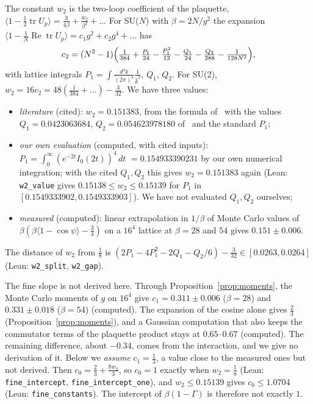 \documentclass[11pt,a4paper]{article}
\theoremstyle{definition}
\theoremstyle{remark}
\newcommand{\code}[1]{\texttt{#1}}
\begin{document}
The constant $w_2$ is the two-loop coefficient of the plaquette, $\langle1-\frac12\operatorname{tr}U_p\rangle=\frac3{4\beta}+\frac{w_2}{\beta^2}+\dots$ For SU($N$) with $\beta=2N/g^2$ the expansion $\langle1-\frac1N\operatorname{Re}\operatorname{tr}U_p\rangle=c_1g^2+c_2g^4+\dots$ has~\cite{AFP}
\[
c_2=(N^2-1)\Bigl(\tfrac1{384}+\tfrac{P_1}{24}-\tfrac{P_1^2}{12}-\tfrac{Q_1}{24}-\tfrac{Q_2}{288}-\tfrac1{128N^2}\Bigr),
\]
with lattice integrals $P_1=\int\frac{d^4k}{(2\pi)^4}\frac1{\hat k^2}$, $Q_1$, $Q_2$. For SU(2), $w_2=16c_2=48(\tfrac1{384}+\dots)-\tfrac3{32}$. We have three values:
\begin{itemize}[leftmargin=1.5em,itemsep=1pt,topsep=2pt]
\item \emph{literature} (cited): $w_2=0.151383$, from the formula of~\cite{AFP} with the values $Q_1=0.0423063684$, $Q_2=0.054623978180$ of~\cite{LW} and the standard $P_1$;
\item \emph{our own evaluation} (computed, with cited inputs): $P_1=\int_0^\infty(e^{-2t}I_0(2t))^4\,dt$ $=0.154933390231$ by our own numerical integration; with the cited $Q_1,Q_2$ this gives $w_2=0.151383$ again (Lean: \code{w2\_value} gives $0.15138\le w_2\le0.15139$ for $P_1$ in $[0.1549333902,0.1549333903]$). We have not evaluated $Q_1,Q_2$ ourselves;
\item \emph{measured} (computed): linear extrapolation in $1/\beta$ of Monte Carlo values of $\beta(\beta\langle1-\cos\psi\rangle-\frac34)$ on a $16^4$ lattice at $\beta=28$ and $54$ gives $0.151\pm0.006$.
\end{itemize}
The distance of $w_2$ from $\frac18$ is $(2P_1-4P_1^2-2Q_1-Q_2/6)-\frac3{32}\in[0.0263,0.0264]$ (Lean: \code{w2\_split}, \code{w2\_gap}).

The fine slope is not derived here. Through Proposition~\ref{prop:moments}, the Monte Carlo moments of $y$ on $16^4$ give $c_1=0.311\pm0.006$ ($\beta=28$) and $0.331\pm0.018$ ($\beta=54$) (computed). The expansion of the cosine alone gives $\frac23$ (Proposition~\ref{prop:moments}), and a Gaussian computation that also keeps the commutator terms of the plaquette product stays at $0.65$--$0.67$ (computed). The remaining difference, about $-0.34$, comes from the interaction, and we give no derivation of it. Below we \emph{assume} $c_1=\frac13$, a value close to the measured ones but not derived. Then $c_0=\frac23+\frac{8w_2}3$, so $c_0=1$ exactly when $w_2=\frac18$ (Lean: \code{fine\_intercept}, \code{fine\_intercept\_one}), and $w_2\le0.15139$ gives $c_0\le1.0704$ (Lean: \code{fine\_constants}). The intercept of $\beta(1-\Gamma)$ is therefore not exactly $1$.
\end{document}
